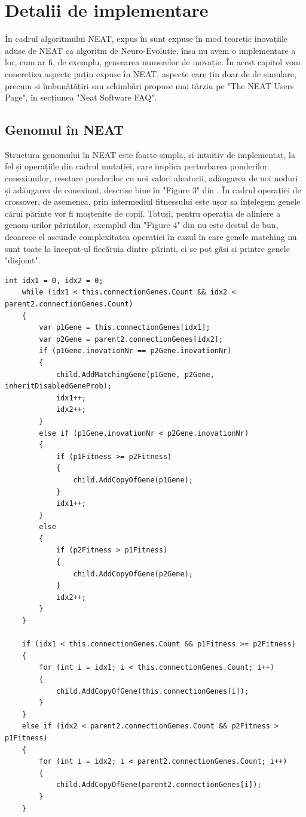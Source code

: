 \chapter{Detalii de implementare}\label{DetaliiImplementare}
În cadrul algoritmului NEAT, expus în \cite{NEAT} sunt expuse în mod teoretic inovațiile aduse de NEAT ca algoritm de Neuro-Evolutie, însa nu avem o implementare a lor, cum ar fi, de exemplu, generarea numerelor de inovație.
În acest capitol vom concretiza aspecte puțin expuse în NEAT, aspecte care țin doar de de simulare, precum și îmbunătățiri sau schimbări propuse mai târziu pe "The NEAT Users Page"\cite{NeatFAQ}, în secțiunea "Neat Software FAQ".

\section{Genomul în NEAT}
Structura genomului în NEAT este foarte simpla, și intuitiv de implementat, la fel și operațiile din cadrul mutației, care implica perturbarea ponderilor conexiunilor, resetare ponderilor cu noi valori aleatorii, adăugarea de noi noduri și adăugarea de conexiuni, descrise bine în "Figure 3" din \cite{NEAT}.
În cadrul operației de crossover, de asemenea, prin intermediul fitnessului este ușor sa înțelegem genele cărui părinte vor fi moștenite de copil.
Totuși, pentru operația de aliniere a genom-urilor părinților, exemplul din "Figure 4" din \cite{NEAT} nu este destul de bun, deoarece el ascunde complexitatea operației în cazul în care genele matching nu sunt toate la început-ul fiecăruia dintre părinți, ci se pot găsi și printre genele "disjoint".

\begin{lstlisting}[language={[Sharp]C}, caption={Parcurgerea genom-urilor celor 2 parinti pentru alinierea lor in cadrul crossover. Prin "this" sunt accesate campurile primului parinte}, label={lst:aliniere}]
    int idx1 = 0, idx2 = 0;
    while (idx1 < this.connectionGenes.Count && idx2 < parent2.connectionGenes.Count)
    {
        var p1Gene = this.connectionGenes[idx1];
        var p2Gene = parent2.connectionGenes[idx2];
        if (p1Gene.inovationNr == p2Gene.inovationNr)
        {
            child.AddMatchingGene(p1Gene, p2Gene, inheritDisabledGeneProb);
            idx1++;
            idx2++;
        }
        else if (p1Gene.inovationNr < p2Gene.inovationNr)
        {
            if (p1Fitness >= p2Fitness)
            {
                child.AddCopyOfGene(p1Gene);
            }
            idx1++;
        }
        else
        {
            if (p2Fitness > p1Fitness)
            {
                child.AddCopyOfGene(p2Gene);
            }
            idx2++;
        }
    }

    if (idx1 < this.connectionGenes.Count && p1Fitness >= p2Fitness)
    {
        for (int i = idx1; i < this.connectionGenes.Count; i++)
        {
            child.AddCopyOfGene(this.connectionGenes[i]);
        }
    }
    else if (idx2 < parent2.connectionGenes.Count && p2Fitness > p1Fitness)
    {
        for (int i = idx2; i < parent2.connectionGenes.Count; i++)
        {
            child.AddCopyOfGene(parent2.connectionGenes[i]);
        }
    }
\end{lstlisting}


